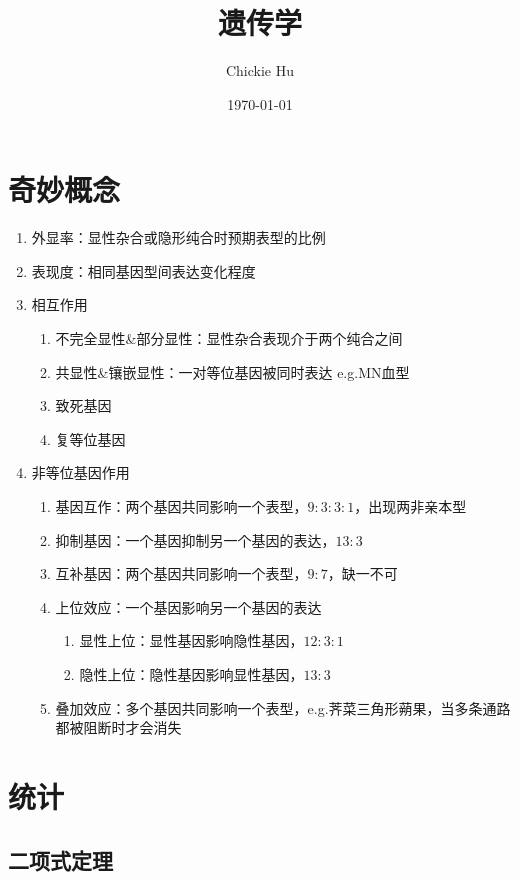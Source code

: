 \documentclass[a4paper, 12pt]{report}
\begin{document}
  \title{遗传学}
  \author{Chickie Hu}
  \date{\today}
  \maketitle
  \tableofcontents
  \chapter{奇妙概念}
  \begin{enumerate}
    \item 外显率：显性杂合或隐形纯合时预期表型的比例
    \item 表现度：相同基因型间表达变化程度
    \item 相互作用 \begin{enumerate}
      \item 不完全显性\&部分显性：显性杂合表现介于两个纯合之间
      \item 共显性\&镶嵌显性：一对等位基因被同时表达 e.g.MN血型
      \item 致死基因
      \item 复等位基因
    \end{enumerate}
    \item 非等位基因作用 \begin{enumerate}
      \item 基因互作：两个基因共同影响一个表型，$9:3:3:1$，出现两非亲本型
      \item 抑制基因：一个基因抑制另一个基因的表达，$13:3$
      \item 互补基因：两个基因共同影响一个表型，$9:7$，缺一不可
      \item 上位效应：一个基因影响另一个基因的表达 \begin{enumerate}
        \item 显性上位：显性基因影响隐性基因，$12:3:1$
        \item 隐性上位：隐性基因影响显性基因，$13:3$
      \end{enumerate}
      \item 叠加效应：多个基因共同影响一个表型，e.g.荠菜三角形蒴果，当多条通路都被阻断时才会消失
    \end{enumerate}
  \end{enumerate}
  \chapter{统计}
  \section{二项式定理}
\end{document}
